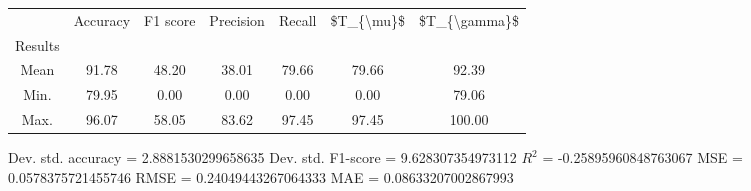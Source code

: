 \begin{tabular}{|c|c|c|c|c|c|c|}
\toprule
{} &  Accuracy &  F1 score &  Precision &  Recall &  \$T\_\{\textbackslash mu\}\$ &  \$T\_\{\textbackslash gamma\}\$ \\
Results &           &           &            &         &            &               \\
\hline
Mean    &     91.78 &     48.20 &      38.01 &   79.66 &      79.66 &         92.39 \\
Min.    &     79.95 &      0.00 &       0.00 &    0.00 &       0.00 &         79.06 \\
Max.    &     96.07 &     58.05 &      83.62 &   97.45 &      97.45 &        100.00 \\
\bottomrule
\end{tabular}

 Dev. std. accuracy = 2.8881530299658635
 Dev. std. F1-score = 9.628307354973112
 $R^2$ = -0.25895960848763067
 MSE = 0.0578375721455746
 RMSE = 0.24049443267064333
 MAE = 0.08633207002867993